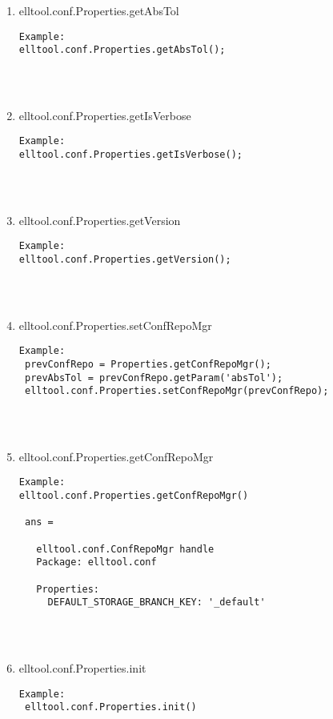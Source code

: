 \begin{enumerate}
\begin{lstlisting}
\end{lstlisting}
\fontfamily{\familydefault}
\selectfont
\item {elltool.conf.Properties.getAbsTol}
\selectfont
\begin{lstlisting}
Example:
elltool.conf.Properties.getAbsTol();




\end{lstlisting}
\fontfamily{\familydefault}
\selectfont
\item {elltool.conf.Properties.getIsVerbose}
\selectfont
\begin{lstlisting}
Example:
elltool.conf.Properties.getIsVerbose();




\end{lstlisting}
\fontfamily{\familydefault}
\selectfont
\item {elltool.conf.Properties.getVersion}
\selectfont
\begin{lstlisting}
Example:
elltool.conf.Properties.getVersion();




\end{lstlisting}
\fontfamily{\familydefault}
\selectfont
\item {elltool.conf.Properties.setConfRepoMgr}
\selectfont
\begin{lstlisting}
Example:
 prevConfRepo = Properties.getConfRepoMgr();
 prevAbsTol = prevConfRepo.getParam('absTol');
 elltool.conf.Properties.setConfRepoMgr(prevConfRepo);




\end{lstlisting}
\fontfamily{\familydefault}
\selectfont
\item {elltool.conf.Properties.getConfRepoMgr}
\selectfont
\begin{lstlisting}
Example:
elltool.conf.Properties.getConfRepoMgr()

 ans =

   elltool.conf.ConfRepoMgr handle
   Package: elltool.conf

   Properties:
     DEFAULT_STORAGE_BRANCH_KEY: '_default'




\end{lstlisting}
\fontfamily{\familydefault}
\selectfont
\item {elltool.conf.Properties.init}
\selectfont
\begin{lstlisting}
Example:
 elltool.conf.Properties.init()




\end{lstlisting}
\end{enumerate}
